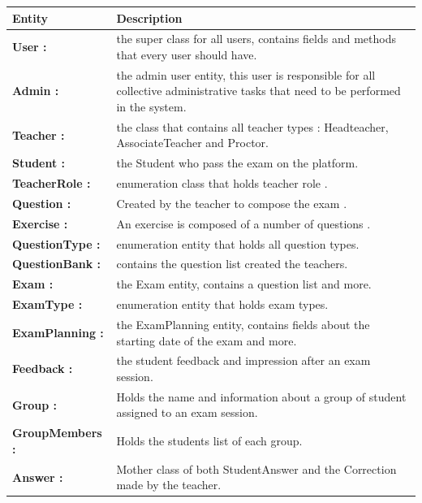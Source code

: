 \documentclass[]{uc2pfecaneva}
\begin{document}
\begin{table}[h]
        \begin{tabularx}{\textwidth}{|l|X|}
            \hline
            Entity          & Description                                                                                              \\ \hline
            \textbf{User :} & the super class for all users, contains fields and methods that every user should have.\\ \hline
            \textbf{Admin :} & the admin user entity, this user is responsible for all collective administrative tasks that need to be performed in the system.\\ \hline
            \textbf{Teacher :} & the class that contains all teacher types : Headteacher, AssociateTeacher and Proctor.\\ \hline
            \textbf{Student :} & the Student who pass the exam on the platform.\\ \hline
            \textbf{TeacherRole :} & enumeration class that holds teacher role .\\ \hline
            \textbf{Question :} & Created by the teacher to compose the exam .\\ \hline
            \textbf{Exercise :} & An exercise is composed of a number of questions .\\ \hline
            \textbf{QuestionType :} & enumeration entity that holds all question types.\\ \hline
            \textbf{QuestionBank :} & contains the question list created the teachers.\\ \hline
            \textbf{Exam :} & the Exam entity, contains a question list and more.\\ \hline
            \textbf{ExamType :} & enumeration entity that holds exam types.\\ \hline
            \textbf{ExamPlanning :} & the ExamPlanning entity, contains fields about the starting date of the exam and more.\\ \hline
            \textbf{Feedback :} & the student feedback and impression after an exam session.\\ \hline
            \textbf{Group :} & Holds the name and information about a group of student assigned to an exam session.\\ \hline
            \textbf{GroupMembers :} & Holds the students list of each group.\\ \hline
            \textbf{Answer :} & Mother class of both StudentAnswer and the Correction made by the teacher.\\ \hline

\end{tabularx}
\end{table}
\end{document}
